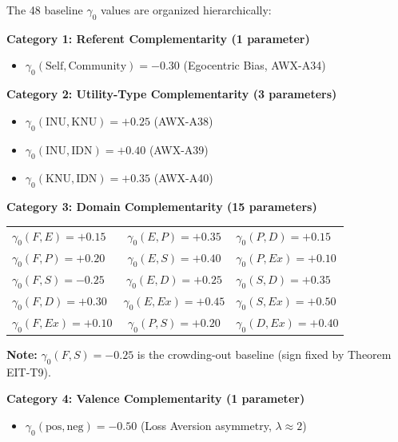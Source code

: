 \begin{tcolorbox}[colback=gray!5!white, colframe=gray!75!black,
    title=\textbf{EIT-EMP-1-D2: Complete Baseline Parameter Specification}]

The 48 baseline $\gamma_0$ values are organized hierarchically:

\textbf{Category 1: Referent Complementarity (1 parameter)}
\begin{itemize}[nosep]
    \item $\gamma_0(\text{Self}, \text{Community}) = -0.30$ \quad (Egocentric Bias, AWX-A34)
\end{itemize}

\textbf{Category 2: Utility-Type Complementarity (3 parameters)}
\begin{itemize}[nosep]
    \item $\gamma_0(\text{INU}, \text{KNU}) = +0.25$ \quad (AWX-A38)
    \item $\gamma_0(\text{INU}, \text{IDN}) = +0.40$ \quad (AWX-A39)
    \item $\gamma_0(\text{KNU}, \text{IDN}) = +0.35$ \quad (AWX-A40)
\end{itemize}

\textbf{Category 3: Domain Complementarity (15 parameters)}

\begin{center}
\small
\begin{tabular}{@{}lcl@{}}
$\gamma_0(F, E) = +0.15$ & $\gamma_0(E, P) = +0.35$ & $\gamma_0(P, D) = +0.15$ \\
$\gamma_0(F, P) = +0.20$ & $\gamma_0(E, S) = +0.40$ & $\gamma_0(P, Ex) = +0.10$ \\
$\gamma_0(F, S) = \mathbf{-0.25}$ & $\gamma_0(E, D) = +0.25$ & $\gamma_0(S, D) = +0.35$ \\
$\gamma_0(F, D) = +0.30$ & $\gamma_0(E, Ex) = +0.45$ & $\gamma_0(S, Ex) = +0.50$ \\
$\gamma_0(F, Ex) = +0.10$ & $\gamma_0(P, S) = +0.20$ & $\gamma_0(D, Ex) = +0.40$ \\
\end{tabular}
\end{center}

\textbf{Note:} $\gamma_0(F, S) = -0.25$ is the crowding-out baseline (sign fixed by Theorem EIT-T9).

\textbf{Category 4: Valence Complementarity (1 parameter)}
\begin{itemize}[nosep]
    \item $\gamma_0(\text{pos}, \text{neg}) = -0.50$ \quad (Loss Aversion asymmetry, $\lambda \approx 2$)
\end{itemize}


\end{tcolorbox}
